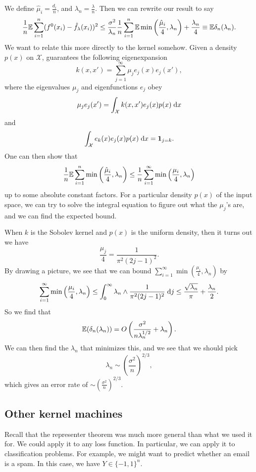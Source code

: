 \documentclass[a4paper]{article}
\begin{document}
We define $\hat{\mu}_i = \frac{d_i}{n}$, and $\lambda_n = \frac{\lambda}{n}$. Then we can rewrite our result to say
\[
  \frac{1}{n} \mathbb{E} \sum_{i = 1}^n (f^0(x_i) - \hat{f}_\lambda (x_i))^2 \leq \frac{\sigma^2}{\lambda_n} \frac{1}{n} \sum_{i = 1}^n \mathbb{E} \min\left(\frac{\hat{\mu}_i}{4}, \lambda_n\right) + \frac{\lambda_n}{4} \equiv \mathbb{E} \delta_n(\lambda_n).
\]
We want to relate this more directly to the kernel somehow. Given a density $p(x)$ on $\mathcal{X}$,  guarantees the following eigenexpansion
\[
  k(x, x') = \sum_{j = 1}^\infty \mu_j e_j(x) e_j(x'),
\]
where the eigenvalues $\mu_j$ and eigenfunctions $e_j$ obey
\[
  \mu_j e_j(x') = \int_{\mathcal{X}} k(x, x') e_j(x) p(x)\;\mathrm{d} x
\]
and
\[
  \int_{\mathcal{X}} e_k(x) e_j(x) p(x)\;\mathrm{d} x = \mathbf{1}_{j = k}.
\]
One can then show that
\[
  \frac{1}{n} \mathbb{E} \sum_{i = 1}^n \min \left(\frac{\hat{\mu}_i}{4}, \lambda_n\right) \leq \frac{1}{n} \sum_{i = 1}^\infty \min\left(\frac{\mu_i}{4}, \lambda_n\right)
\]
up to some absolute constant factors. For a particular density $p(x)$ of the input space, we can try to solve the integral equation to figure out what the $\mu_j$'s are, and we can find the expected bound.

When $k$ is the Sobolev kernel and $p(x)$ is the uniform density, then it turns out we have
\[
  \frac{\mu_j}{4} = \frac{1}{\pi^2(2j - 1)^2}.
\]
By drawing a picture, we see that we can bound $\sum_{i = 1}^\infty \min \left(\frac{\mu_i}{4} , \lambda_n\right)$ by
\[
  \sum_{i = 1}^\infty \min \left(\frac{\mu_i}{4} , \lambda_n\right) \leq \int_0^\infty \lambda_n \wedge \frac{1}{\pi^2(2j - 1)^2}\;\mathrm{d} j \leq \frac{\sqrt{\lambda_n}}{\pi} + \frac{\lambda_n}{2}.
\]
So we find that
\[
  \mathbb{E}(\delta_n(\lambda_n)) = O \left(\frac{\sigma^2}{n \lambda_n^{1/2}} + \lambda_n\right).
\]
We can then find the $\lambda_n$ that minimizes this, and we see that we should pick
\[
  \lambda_n \sim \left(\frac{\sigma^2}{n}\right)^{2/3},
\]
which gives an error rate of $\sim \left(\frac{\sigma^2}{n}\right)^{2/3}$.

\subsection{Other kernel machines}
Recall that the representer theorem was much more general than what we used it for. We could apply it to any loss function. In particular, we can apply it to classification problems. For example, we might want to predict whether an email is a spam. In this case, we have $Y \in \{-1, 1\}^n$.
\end{document}
